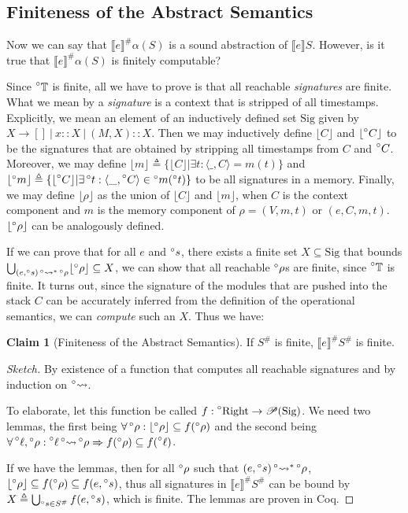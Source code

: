 \documentclass{article}
\theoremstyle{definition}
\newtheorem{clm}{Claim}[section]
\newcommand*{\pset}{\mathscr{P}}
\newcommand*{\A}[1]{\prescript{\circ}{}{#1}}
\newcommand*{\Abs}[1]{{#1}^{\#}}
\newcommand*{\Time}{\mathbb{T}}
\newcommand*{\ATime}{\A{\Time}}
\newcommand*{\Right}{\text{Right}}
\newcommand*{\Sig}{\text{Sig}}
\newcommand*{\mem}{m}
\newcommand*{\semarrow}{\rightsquigarrow}
\newcommand*{\asemarrow}{\A{\rightsquigarrow}}
\newcommand*{\sembracket}[1]{\lBrack{#1}\rBrack}
\begin{document}
\subsection{Finiteness of the Abstract Semantics}
Now we can say that $\Abs{\sembracket{e}}\alpha(S)$ is a sound abstraction of $\sembracket{e}S$.
However, is it true that $\Abs{\sembracket{e}}\alpha(S)$ is finitely computable?

Since $\ATime$ is finite, all we have to prove is that all reachable \emph{signatures} are finite.
What we mean by a \emph{signature} is a context that is stripped of all timestamps.
Explicitly, we mean an element of an inductively defined set $\Sig$ given by $X\rightarrow []\:|\:x::X\:|\:(M,X)::X$.
Then we may inductively define $\lfloor C\rfloor$ and $\lfloor \A{C}\rfloor$ to be the signatures that are obtained by stripping all timestamps from $C$ and $\A{C}$.
Moreover, we may define $\lfloor m\rfloor\triangleq\{\lfloor C\rfloor|\exists t:\langle\_,C\rangle=m(t)\}$ and $\lfloor\A{m}\rfloor\triangleq\{\lfloor\A{C}\rfloor|\exists\A{t}:\langle\_,\A{C}\rangle\in\A{m}(\A{t})\}$ to be all signatures in a memory.
Finally, we may define $\lfloor\rho\rfloor$ as the union of $\lfloor C\rfloor$ and $\lfloor m\rfloor$, when $C$ is the context component and $m$ is the memory component of $\rho=(V,\mem,t)$ or $(e,C,\mem,t)$.
$\lfloor\A\rho\rfloor$ can be analogously defined.

If we can prove that for all $e$ and $\A{s}$, there exists a finite set $X\subseteq\Sig$ that bounds $\bigcup_{(e,\A{s})\A\semarrow^*\A\rho}\lfloor\A\rho\rfloor\subseteq X$, we can show that all reachable $\A\rho$s are finite, since $\ATime$ is finite.
It turns out, since the signature of the modules that are pushed into the stack $C$ can be accurately inferred from the definition of the operational semantics, we can \emph{compute} such an $X$.
Thus we have:
\begin{clm}[Finiteness of the Abstract Semantics]
  If $\Abs{S}$ is finite, $\Abs{\sembracket{e}}\Abs{S}$ is finite.
\end{clm}
\begin{proof}[Sketch]
  By existence of a function that computes all reachable signatures and by induction on $\asemarrow$.

  To elaborate, let this function be called $f:\A\Right\rightarrow\pset(\Sig)$.
  We need two lemmas, the first being $\forall\A\rho:\lfloor\A\rho\rfloor\subseteq f(\A\rho)$ and the second being $\forall\A\ell,\A\rho:\A\ell\A\semarrow\A\rho\Rightarrow f(\A\rho)\subseteq f(\A\ell)$.

  If we have the lemmas, then for all $\A\rho$ such that $(e,\A{s})\A\semarrow^*\A\rho$, $\lfloor\A\rho\rfloor\subseteq f(\A\rho)\subseteq f(e,\A{s})$, thus all signatures in $\Abs{\sembracket{e}}\Abs{S}$ can be bound by $X\triangleq\bigcup_{\A{s}\in\Abs{S}}f(e,\A{s})$, which is finite.
  The lemmas are proven in Coq.
\end{proof}
\end{document}
